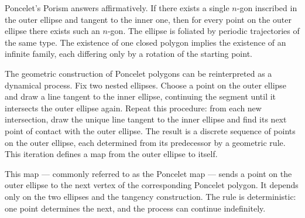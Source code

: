 Poncelet’s Porism answers affirmatively. If there exists a single $n$-gon inscribed in the outer ellipse and tangent to the inner one, then for every point on the outer ellipse there exists such an $n$-gon. The ellipse is foliated by periodic trajectories of the same type. The existence of one closed polygon implies the existence of an infinite family, each differing only by a rotation of the starting point.

\begin{center}
\end{center}

The geometric construction of Poncelet polygons can be reinterpreted as a dynamical process. Fix two nested ellipses. Choose a point on the outer ellipse and draw a line tangent to the inner ellipse, continuing the segment until it intersects the outer ellipse again. Repeat this procedure: from each new intersection, draw the unique line tangent to the inner ellipse and find its next point of contact with the outer ellipse. The result is a discrete sequence of points on the outer ellipse, each determined from its predecessor by a geometric rule. This iteration defines a map from the outer ellipse to itself.

This map — commonly referred to as the Poncelet map — sends a point on the outer ellipse to the next vertex of the corresponding Poncelet polygon. It depends only on the two ellipses and the tangency construction. The rule is deterministic: one point determines the next, and the process can continue indefinitely.

